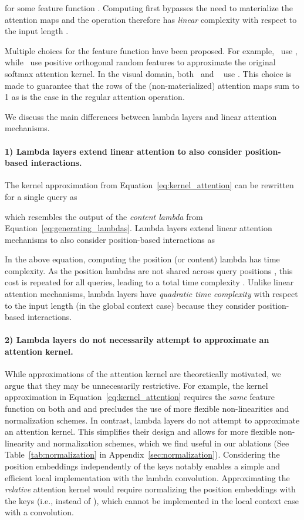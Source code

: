 \documentclass{article} \usepackage{iclr2021_conference,times}
\begin{document}
for some feature function .
Computing  first bypasses the need to materialize the attention maps  and the operation therefore has \emph{linear} complexity with respect to the input length .

Multiple choices for the feature function  have been proposed.
For example,~\cite{katharopoulos2020transformers} use , while~\cite{choromanski2020rethinking} use positive orthogonal random features to approximate the original softmax attention kernel.
In the visual domain, both~\cite{chen2018double} and ~\cite{shen2018efficient} use .
This choice is made to guarantee that the rows of the (non-materialized) attention maps  sum to 1 as is the case in the regular attention operation.

We discuss the main differences between lambda layers and linear attention mechanisms.

\paragraph{1) Lambda layers extend linear attention to also consider position-based interactions.}
The kernel approximation from Equation~\ref{eq:kernel_attention} can be rewritten for a single query  as

which resembles the output of the \emph{content lambda}  from Equation~\ref{eq:generating_lambdas}.
Lambda layers extend linear attention mechanisms to also consider position-based interactions as

In the above equation, computing the position (or content) lambda has  time complexity.
As the position lambdas are not shared across query positions , this cost is repeated for all  queries, leading to a total time complexity .
Unlike linear attention mechanisms, lambda layers have \emph{quadratic time complexity} with respect to the input length (in the global context case) because they consider position-based interactions.

\paragraph{2) Lambda layers do not necessarily attempt to approximate an attention kernel.}
While approximations of the attention kernel are theoretically motivated, we argue that they may be unnecessarily restrictive.
For example, the kernel approximation in Equation~\ref{eq:kernel_attention} requires the \emph{same} feature function  on both  and  and precludes the use of more flexible non-linearities and normalization schemes.
In contrast, lambda layers do not attempt to approximate an attention kernel.
This simplifies their design and allows for more flexible non-linearity and normalization schemes, which we find useful in our ablations (See Table~\ref{tab:normalization} in Appendix~\ref{sec:normalization}).
Considering the position embeddings independently of the keys notably enables a simple and efficient local implementation with the lambda convolution.
Approximating the \emph{relative} attention kernel would require normalizing the position embeddings with the keys (i.e.,  instead of ), which cannot be implemented in the local context case with a convolution.
\end{document}
